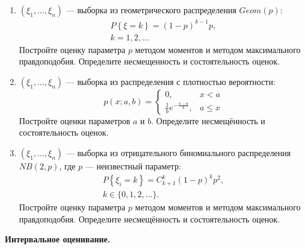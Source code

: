 \documentclass[a4paper,12pt]{article}
\newcommand{\probability}[1]{P \left\{ #1 \right\}}
\newcommand{\sample}[2]{\left( #1_1, \dots, #1_{#2} \right)}
\newcommand{\theme}[1]{\hfil \textbf{#1} \hfil}
\begin{document}
\begin{enumerate}[resume, topsep=1cm, parsep=1cm]
        \item $\sample{\xi}{n}$ --- выборка из геометрического распределения $Geom(p)$:
              \begin{gather*}
                  \probability{\xi = k} = (1-p)^{k-1} p , \\
                  k = 1, 2, ...
              \end{gather*}
              Постройте оценку параметра $p$ методом моментов и методом максимального правдоподобия. Определите несмещенность и состоятельность оценок.

        \item $\sample{\xi}{n}$ --- выборка из распределения с плотностью вероятности:
              \[
                  p(x; a, b)
                  = \left \{
                  \begin{array}{ll}
                      0,                              & x < a   \\
                      \frac{1}{b} e^{-\frac{x-a}{b}}, & a \le x
                  \end{array}
                  \right .
              \]
              Постройте оценки параметров $a$ и $b$. Определите несмещённость и состоятельность оценок.

        \item $\sample{\xi}{n}$ --- выборка из отрицательного биномиального распределения $NB(2,p)$, где $p$ --- неизвестный параметр:
              \begin{gather*}
                  \probability{\xi_i = k} = C_{k+1}^k (1-p)^k p^2 , \\
                  k \in \{0, 1, 2, \dots \} .
              \end{gather*}
              Постройте оценку параметра $p$ методом моментов и методом максимального правдоподобия. Определите несмещённость и состоятельность оценок.
    \end{enumerate}

    \theme{Интервальное оценивание.}
\end{document}
